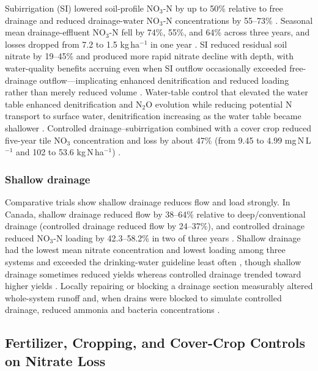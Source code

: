 Subirrigation (SI) lowered soil-profile NO$_3$-N by up to 50\% relative to free drainage and reduced drainage-water NO$_3$-N concentrations by 55--73\% \parencite{Elmi2004}. Seasonal mean drainage-effluent NO$_3$-N fell by 74\%, 55\%, and 64\% across three years, and losses dropped from 7.2 to 1.5 kg\,ha$^{-1}$ in one year \parencite{Elmi2004}. SI reduced residual soil nitrate by 19--45\% and produced more rapid nitrate decline with depth, with water-quality benefits accruing even when SI outflow occasionally exceeded free-drainage outflow---implicating enhanced denitrification and reduced loading rather than merely reduced volume \parencite{Elmi2002}. Water-table control that elevated the water table enhanced denitrification and N$_2$O evolution while reducing potential N transport to surface water, denitrification increasing as the water table became shallower \parencite{KLIEWER1995}. Controlled drainage--subirrigation combined with a cover crop reduced five-year tile NO$_3$ concentration and loss by about 47\% (from 9.45 to 4.99 mg\,N\,L$^{-1}$ and 102 to 53.6 kg\,N\,ha$^{-1}$) \parencite{Drury2014}.

\subsubsection{Shallow drainage}

Comparative trials show shallow drainage reduces flow and load strongly. In Canada, shallow drainage reduced flow by 38--64\% relative to deep/conventional drainage (controlled drainage reduced flow by 24--37\%), and controlled drainage reduced NO$_3$-N loading by 42.3--58.2\% in two of three years \parencite{Smith2019}. Shallow drainage had the lowest mean nitrate concentration and lowest loading among three systems and exceeded the drinking-water guideline least often \parencite{Smith2011b,Smith2019}, though shallow drainage sometimes reduced yields whereas controlled drainage trended toward higher yields \parencite{Smith2019,Smith2011b}. Locally repairing or blocking a drainage section measurably altered whole-system runoff and, when drains were blocked to simulate controlled drainage, reduced ammonia and bacteria concentrations \parencite{Wesström2015,RITTER1995}.

\subsection{Fertilizer, Cropping, and Cover-Crop Controls on Nitrate Loss}

